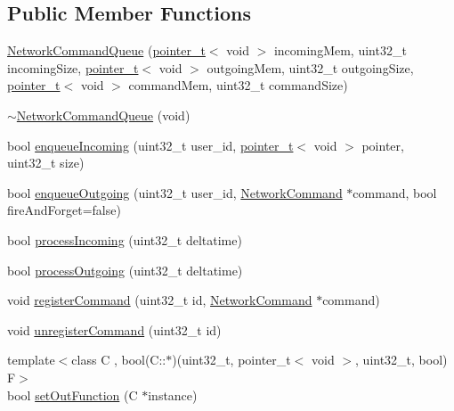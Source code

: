 \subsection*{Public Member Functions}
\begin{DoxyCompactItemize}
\item 
\hyperlink{classcrap_1_1_network_command_queue_af46119ec3b158606befedce4c9492fa1}{Network\+Command\+Queue} (\hyperlink{structcrap_1_1pointer__t}{pointer\+\_\+t}$<$ void $>$ incoming\+Mem, uint32\+\_\+t incoming\+Size, \hyperlink{structcrap_1_1pointer__t}{pointer\+\_\+t}$<$ void $>$ outgoing\+Mem, uint32\+\_\+t outgoing\+Size, \hyperlink{structcrap_1_1pointer__t}{pointer\+\_\+t}$<$ void $>$ command\+Mem, uint32\+\_\+t command\+Size)
\item 
\hyperlink{classcrap_1_1_network_command_queue_a0a6131ea7e61bc7936b19bfa97164877}{$\sim$\+Network\+Command\+Queue} (void)
\item 
bool \hyperlink{classcrap_1_1_network_command_queue_a8ce0e6c1b9e8d288ebe17b96272acd2d}{enqueue\+Incoming} (uint32\+\_\+t user\+\_\+id, \hyperlink{structcrap_1_1pointer__t}{pointer\+\_\+t}$<$ void $>$ pointer, uint32\+\_\+t size)
\item 
bool \hyperlink{classcrap_1_1_network_command_queue_afc36772c3a64cef5092e75a30052030b}{enqueue\+Outgoing} (uint32\+\_\+t user\+\_\+id, \hyperlink{classcrap_1_1_network_command}{Network\+Command} $\ast$command, bool fire\+And\+Forget=false)
\item 
bool \hyperlink{classcrap_1_1_network_command_queue_aa8f160e7566f395502ac1b4ab5878e26}{process\+Incoming} (uint32\+\_\+t deltatime)
\item 
bool \hyperlink{classcrap_1_1_network_command_queue_ac7346d76c2a5c78edfbe1dcb74f5934f}{process\+Outgoing} (uint32\+\_\+t deltatime)
\item 
void \hyperlink{classcrap_1_1_network_command_queue_aaaa0f5fd0353226feecd946146a0fa05}{register\+Command} (uint32\+\_\+t id, \hyperlink{classcrap_1_1_network_command}{Network\+Command} $\ast$command)
\item 
void \hyperlink{classcrap_1_1_network_command_queue_a24f8c08337b976139692fdf5ebfb29e3}{unregister\+Command} (uint32\+\_\+t id)
\item 
{\footnotesize template$<$class C , bool(\+C\+::$\ast$)(uint32\+\_\+t, pointer\+\_\+t$<$ void $>$, uint32\+\_\+t, bool) F$>$ }\\bool \hyperlink{classcrap_1_1_network_command_queue_a6cf955a33a605f26c6eb1079f545172a}{set\+Out\+Function} (C $\ast$instance)

\end{DoxyCompactItemize}

